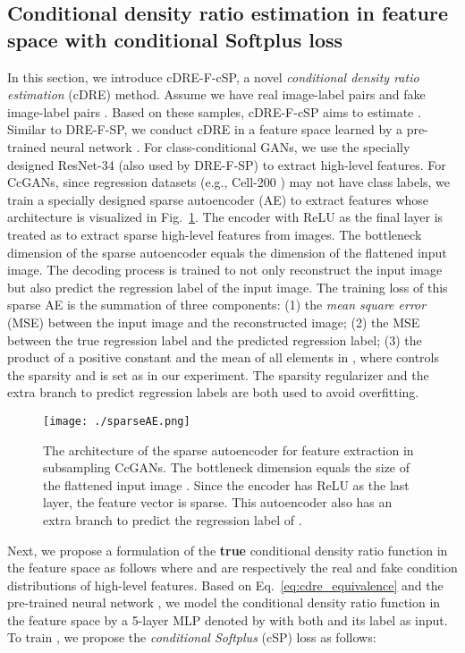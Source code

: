 \documentclass[10pt, twocolumn]{article}
\theoremstyle{definition}
\begin{document}
\subsection{Conditional density ratio estimation in feature space with conditional Softplus loss} \label{sec:cDRE-F-cSP}
In this section, we introduce cDRE-F-cSP, a novel \textit{conditional density ratio estimation} (cDRE) method. Assume we have  real image-label pairs  and  fake image-label pairs . Based on these samples, cDRE-F-cSP aims to estimate .
Similar to DRE-F-SP, we conduct cDRE in a feature space learned by a pre-trained neural network . For class-conditional GANs, we use the specially designed ResNet-34 (also used by DRE-F-SP) to extract high-level features. For CcGANs, since regression datasets (e.g., Cell-200 \cite{ding2020continuous}) may not have class labels, we train a specially designed sparse autoencoder (AE) to extract features whose architecture is visualized in Fig.\ \ref{fig:sparseAE}. The encoder with ReLU \cite{glorot2011deep} as the final layer is treated as  to extract sparse high-level features from images. The bottleneck dimension of the sparse autoencoder equals the dimension of the flattened input image. The decoding process is trained to not only reconstruct the input image but also predict the regression label of the input image. The training loss of this sparse AE is the summation of three components: (1) the \textit{mean square error} (MSE) between the input image and the reconstructed image; (2) the MSE between the true regression label and the predicted regression label; (3) the product of a positive constant  and the mean of all elements in , where  controls the sparsity and is set as  in our experiment. 
The sparsity regularizer and the extra branch to predict regression labels are both used to avoid overfitting. 
\begin{figure}[!htbp]
	\centering
	\texttt{[image: ./sparseAE.png]}
	\caption{The architecture of the sparse autoencoder for feature extraction in subsampling CcGANs. The bottleneck dimension equals the size of the flattened input image . Since the encoder has ReLU as the last layer, the feature vector  is sparse. This autoencoder also has an extra branch to predict the regression label of .}
	\label{fig:sparseAE}
\end{figure}





Next, we propose a formulation of the \textbf{true} conditional density ratio function in the feature space as follows
  where  and  are respectively the real and fake condition distributions of high-level features. Based on Eq.\ \eqref{eq:cdre_equivalence} and the pre-trained neural network , we model the conditional density ratio function  in the feature space by a 5-layer MLP denoted by  with both  and its label  as input. To train , we propose the \textit{conditional Softplus} (cSP) loss as follows: 
\end{document}

